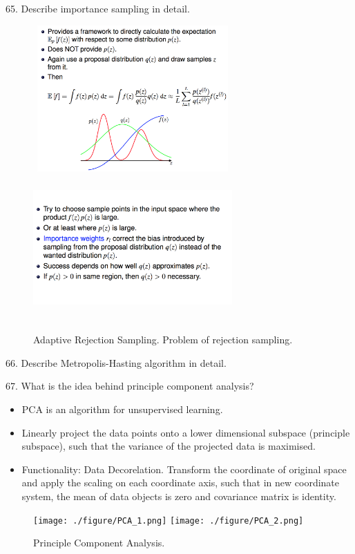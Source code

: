 \documentclass[11pt,a4paper]{article}
\begin{document}
65. Describe importance sampling in detail.
\begin{figure}[H] \centering
    \includegraphics[width=3in,height=2.2in]{./figure/importanceSampling_1.png}
    \includegraphics[width=3in,height=2.2in]{./figure/importanceSampling_2.png}
    \caption{Adaptive Rejection Sampling. Problem of rejection sampling.}
\end{figure}

66. Describe Metropolis-Hasting algorithm in detail.

67. What is the idea behind principle component analysis?

\begin{itemize}
\item PCA is an algorithm for unsupervised learning. 
\item Linearly project the data points onto a lower dimensional subspace (principle subspace), such that the variance of the projected data is maximised.
\item Functionality: Data Decorelation. Transform the coordinate of original space and apply the scaling on each coordinate axis, such that in new coordinate system, the mean of data objects is zero and covariance matrix is identity.
\end{itemize}
\begin{figure}[H] \centering
    \texttt{[image: ./figure/PCA\_1.png]}
    \texttt{[image: ./figure/PCA\_2.png]}
    \caption{Principle Component Analysis.}
\end{figure}
\end{document}
